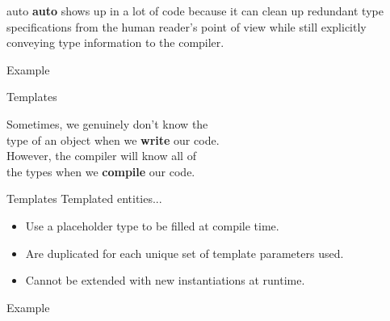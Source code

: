 \documentclass{beamer}
\begin{document}
	
	\begin{frame}{auto}
		\textbf{auto} shows up in a lot of code because it can clean up redundant type specifications from the human reader's point of view while still explicitly conveying type information to the compiler.
		
		\begin{exampleblock}{Example}
			\lstI
		\end{exampleblock}
		
	\end{frame}
	
	\begin{frame}{Templates}
		\begin{center}
			Sometimes, we genuinely don't know the\\ 
			type of an object when we \textbf{write} our code.\\
			\bigskip
			However, the compiler will know all of\\ 
			the types when we \textbf{compile} our code.
		\end{center}
	\end{frame}
	
	
	\begin{frame}{Templates}
		Templated entities...
		\begin{itemize}
			\item Use a placeholder type to be filled at compile time.
			\item Are duplicated for each unique set of template parameters used.
			\item Cannot be extended with new instantiations at runtime.
		\end{itemize}
		\bigskip
		\begin{exampleblock}{Example}
			\lstI
		\end{exampleblock}
	\end{frame}
	
\end{document}
